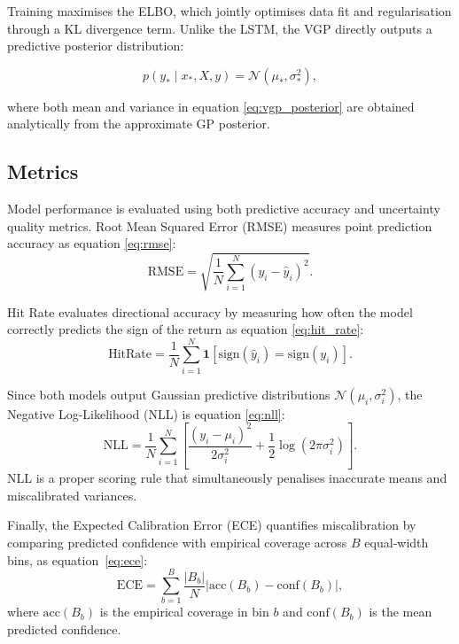 Training maximises the ELBO, which jointly optimises data fit and regularisation through a KL divergence term. Unlike the LSTM, the VGP directly outputs a predictive posterior distribution:

\begin{equation}
    p(y_* \mid x_*, X, y) = \mathcal{N}(\mu_*, \sigma_*^2),
    \label{eq:vgp_posterior}
\end{equation}

where both mean and variance in equation \ref{eq:vgp_posterior} are obtained analytically from the approximate GP posterior.

\subsection{Metrics}
\label{sec:metrics}

Model performance is evaluated using both predictive accuracy and uncertainty quality metrics. Root Mean Squared Error (RMSE) measures point prediction accuracy as equation \ref{eq:rmse}:
\begin{equation}
    \mathrm{RMSE} = \sqrt{\frac{1}{N}\sum_{i=1}^N (y_i - \hat{y}_i)^2}.
    \label{eq:rmse}
\end{equation}

Hit Rate evaluates directional accuracy by measuring how often the model correctly predicts the sign of the return as equation \ref{eq:hit_rate}:
\begin{equation}
    \mathrm{HitRate} = \frac{1}{N}\sum_{i=1}^N \mathbf{1}\!\left[\mathrm{sign}(\hat{y}_i) = \mathrm{sign}(y_i)\right].
    \label{eq:hit_rate}
\end{equation}

Since both models output Gaussian predictive distributions $\mathcal{N}(\mu_i, \sigma_i^2)$, the Negative Log-Likelihood (NLL) is equation \ref{eq:nll}:
\begin{equation}
    \mathrm{NLL} = \frac{1}{N}\sum_{i=1}^N \left[\frac{(y_i - \mu_i)^2}{2\sigma_i^2} + \frac{1}{2}\log(2\pi\sigma_i^2)\right].
    \label{eq:nll}
\end{equation}
NLL is a proper scoring rule that simultaneously penalises inaccurate means and miscalibrated variances.

Finally, the Expected Calibration Error (ECE) quantifies miscalibration by comparing predicted confidence with empirical coverage across $B$ equal-width bins, as equation~\ref{eq:ece}:
\begin{equation}
    \mathrm{ECE} = \sum_{b=1}^B \frac{|B_b|}{N} \left|\mathrm{acc}(B_b) - \mathrm{conf}(B_b)\right|,
    \label{eq:ece}
\end{equation}
where $\mathrm{acc}(B_b)$ is the empirical coverage in bin $b$ and $\mathrm{conf}(B_b)$ is the mean predicted confidence.


